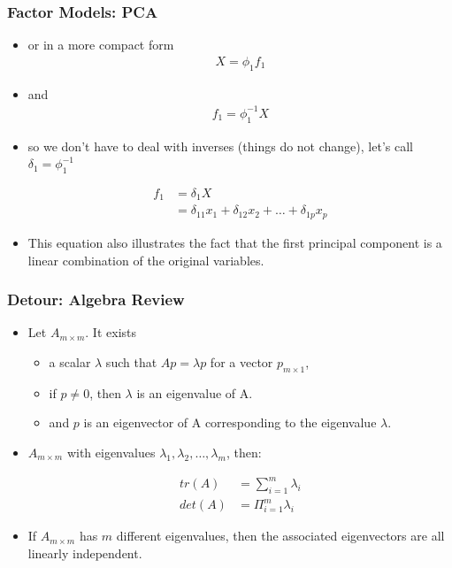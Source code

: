 \documentclass[
  shownotes,
  xcolor={svgnames},
  hyperref={colorlinks,citecolor=DarkBlue,linkcolor=DarkRed,urlcolor=DarkBlue}
  , aspectratio=169]{beamer}
\begin{document}
\begin{frame}
\frametitle{Factor Models: PCA}

\begin{itemize}

\item or in a more compact form
\begin{align}
X = \phi_1 f_1
\end{align}

\item and
\begin{align}
f_1 = \phi_1^{-1}X
\end{align}

\item so we don't have to deal with inverses (things do not change), let's call $\delta_1=\phi_1^{-1}$

\begin{align}
f_1 &= \delta_1 X \\
    &= \delta_{11} x_1+ \delta_{12} x_2 + \dots + \delta_{1p} x_p
\end{align}

\item This equation also illustrates the fact that the first principal component is a linear combination of the original variables. 
\end{itemize}


\end{frame}
\begin{frame}
\frametitle{Detour: Algebra Review}

\begin{itemize}

\item Let $A_{m\times m}$. It exists 
\begin{itemize}
  \item a scalar $\lambda$ such that $Ap = \lambda p$ for a vector $p_{m\times 1}$, 
  \item if $p \neq 0$, then $\lambda$ is an eigenvalue of A. 
  \item and $p$ is an eigenvector of A corresponding to the eigenvalue $\lambda$.
\end{itemize}

\item $A_{m\times m}$ with eigenvalues $\lambda_1, \lambda_2,\dots,\lambda_m$, then:

\begin{align}
tr(A) &= \sum_{i=1}^m \lambda_i \\
det(A) &= \Pi_{i=1}^m \lambda_i
\end{align}

\item If $A_{m\times m}$ has $m$ different eigenvalues, then the associated eigenvectors are all linearly independent.
\end{itemize}
\end{frame}
\end{document}
